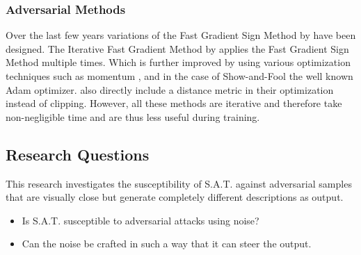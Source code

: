 \subsubsection*{Adversarial Methods}
Over the last few years variations of the Fast Gradient Sign Method by \cite{goodfellow2015explaining} have been designed. The Iterative Fast Gradient Method by \citeauthor{Kurakin} applies the Fast Gradient Sign Method multiple times. Which is further improved by using various optimization techniques such as momentum \cite{9237700}, and in the case of Show-and-Fool the well known Adam\cite{kingma2017adam} optimizer. \citeauthor{EvaluatingRobustness} also directly include a distance metric in their optimization instead of clipping. However, all these methods are iterative and therefore take non-negligible time and are thus less useful during training.

\subsection{Research Questions}
This research investigates the susceptibility of S.A.T. against adversarial samples that are visually close but generate completely different descriptions as output.
\begin{itemize}
    \item Is S.A.T. susceptible to adversarial attacks using noise?
    \item Can the noise be crafted in such a way that it can steer the output.
\end{itemize}
